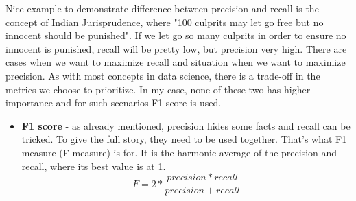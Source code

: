 Nice example to demonstrate difference between precision and recall is the concept of Indian Jurisprudence, where "100 culprits may let go free but no innocent should be punished". If we let go so many culprits in order to ensure no innocent is punished, recall will be pretty low, but precision very high. There are cases when we want to maximize recall and situation when we want to maximize precision. As with most concepts in data science, there is a trade-off in the metrics we choose to prioritize. In my case, none of these two has higher importance and for such scenarios F1 score is used.
\begin{itemize}
\item \textbf{F1 score} - as already mentioned, precision hides some facts and recall can be tricked. To give the full story, they need to be used together. That's what F1 measure (F measure) is for. It is the harmonic average of the precision and recall, where its best value is at 1.
\[ F = 2 * \frac{precision * recall}{precision + recall}\]
\end{itemize}